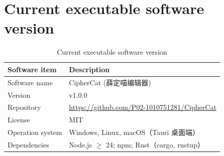 \documentclass[preprint,12pt,a4paper]{elsarticle}
\begin{document}

\section*{Current executable software version}
\label{sec:execversion}

\begin{table}[htbp]
	\centering
	\begin{tabular}{|l|p{9.5cm}|}
		\hline
		\textbf{Software item} & \textbf{Description}                              \\
		\hline
		Software name          & CipherCat (薛定喵编辑器)                                \\
		\hline
		Version                & v1.0.0                                            \\
		\hline
		Repository             & \url{https://github.com/P02-1010751281/CipherCat} \\
		\hline
		License                & MIT                                               \\
		\hline
		Operation system       & Windows, Linux, macOS（Tauri 桌面端）                  \\
		\hline
		Dependencies           & Node.js $\ge$ 24; npm; Rust（cargo, rustup）        \\
		\hline
	\end{tabular}
	\caption{Current executable software version}
	\label{tab:version}
\end{table}
\end{document}
